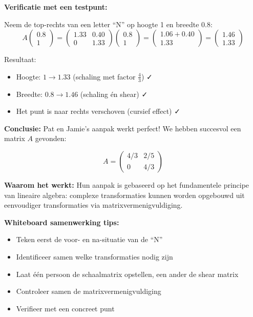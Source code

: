 \documentclass{ximera}
\begin{document}
\begin{freeResponse}
\textbf{Verificatie met een testpunt:}

Neem de top-rechts van een letter ``N'' op hoogte 1 en breedte 0.8:
$$A \begin{pmatrix} 0.8 \\ 1 \end{pmatrix} = \begin{pmatrix} 1.33 & 0.40 \\ 0 & 1.33 \end{pmatrix} \begin{pmatrix} 0.8 \\ 1 \end{pmatrix} = \begin{pmatrix} 1.06 + 0.40 \\ 1.33 \end{pmatrix} = \begin{pmatrix} 1.46 \\ 1.33 \end{pmatrix}$$

Resultaat:
\begin{itemize}
\item Hoogte: $1 \to 1.33$ (schaling met factor $\frac{4}{3}$) ✓
\item Breedte: $0.8 \to 1.46$ (schaling én shear) ✓
\item Het punt is naar rechts verschoven (cursief effect) ✓
\end{itemize}

\textbf{Conclusie:} Pat en Jamie's aanpak werkt perfect! We hebben succesvol een matrix $A$ gevonden:

$$\boxed{A = \begin{pmatrix} 4/3 & 2/5 \\ 0 & 4/3 \end{pmatrix}}$$

\textbf{Waarom het werkt:}
Hun aanpak is gebaseerd op het fundamentele principe van lineaire algebra: complexe transformaties kunnen worden opgebouwd uit eenvoudiger transformaties via matrixvermenigvuldiging.

\textbf{Whiteboard samenwerking tips:}
\begin{itemize}
\item Teken eerst de voor- en na-situatie van de ``N''
\item Identificeer samen welke transformaties nodig zijn
\item Laat één persoon de schaalmatrix opstellen, een ander de shear matrix
\item Controleer samen de matrixvermenigvuldiging
\item Verifieer met een concreet punt
\end{itemize}


\end{freeResponse}
\end{document}
